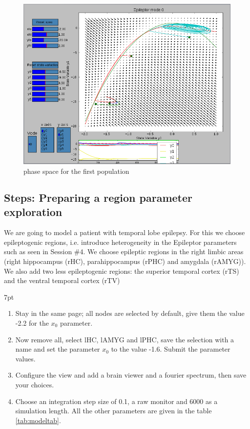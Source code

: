 \documentclass{tufte-handout}
\newenvironment{simulation}{%
  \def\FrameCommand{%
    \hspace{1pt}%
    {\color{ForestGreen}\vrule width 2pt}%
    {\color{simulationshade}\vrule width 4pt}%
    \colorbox{simulationshade}%
  }%
  \MakeFramed{\advance\hsize-\width\FrameRestore}%
  \noindent\hspace{-4.55pt}%
  \begin{adjustwidth}{}{7pt}%
  \vspace{2pt}\vspace{2pt}%
}
{%
  \vspace{2pt}\end{adjustwidth}\endMakeFramed%
}
\begin{document}
\begin{figure}[h]
  \includegraphics[width=\linewidth]{Handout_UI_ModellingAnEpilepticPatient_PhaseSpace}%
  \caption{phase space for the first population}%
  \label{fig:phase_space}%
\end{figure}
\subsection{Steps: Preparing a region parameter exploration }

We are going to model a patient with temporal lobe epilepsy. For this we choose epileptogenic regions, i.e. 
introduce heterogeneity in the Epileptor parameters such as seen in Session \#4. We choose epileptic regions in the right limbic areas 
(right hippocampus (rHC), parahippocampus (rPHC) and amygdala (rAMYG)). We also add two less epileptogenic regions: 
the superior temporal cortex (rTS) and the ventral temporal cortex (rTV)

\begin{simulation}
  \begin{enumerate}
  \item Stay in the same page; all nodes are selected by default, give them the value -2.2 for the $x_0$ parameter.
  \item Now remove all, select lHC, lAMYG and lPHC, save the selection with a name
	and set the parameter $x_0$ to the value -1.6. Submit the parameter values.
  \item Configure the view and add a brain viewer and a fourier spectrum, then save your choices.
  \item Choose an integration step size of 0.1, a raw monitor and 6000 as a simulation length. All the other parameters are
  given in the table \ref{tab:modeltab}.
 \end{enumerate}
\end{simulation}
\end{document}
